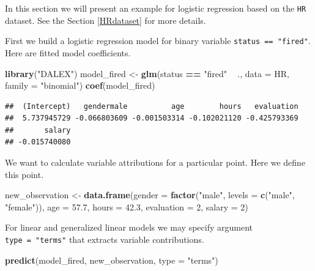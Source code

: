\documentclass[]{krantz}
\newenvironment{Shaded}{\begin{snugshade}}{\end{snugshade}}
\newcommand{\DataTypeTok}[1]{\textcolor[rgb]{0.13,0.29,0.53}{#1}}
\newcommand{\DecValTok}[1]{\textcolor[rgb]{0.00,0.00,0.81}{#1}}
\newcommand{\FloatTok}[1]{\textcolor[rgb]{0.00,0.00,0.81}{#1}}
\newcommand{\KeywordTok}[1]{\textcolor[rgb]{0.13,0.29,0.53}{\textbf{#1}}}
\newcommand{\NormalTok}[1]{#1}
\newcommand{\OperatorTok}[1]{\textcolor[rgb]{0.81,0.36,0.00}{\textbf{#1}}}
\newcommand{\StringTok}[1]{\textcolor[rgb]{0.31,0.60,0.02}{#1}}
\theoremstyle{definition}
\theoremstyle{definition}
\theoremstyle{definition}
\theoremstyle{remark}
\begin{document}
In this section we will present an example for logistic regression based
on the \texttt{HR} dataset. See the Section \ref{HRdataset} for more
details.

First we build a logistic regression model for binary variable
\texttt{status\ ==\ "fired"}. Here are fitted model coefficients.

\begin{Shaded}
\begin{Highlighting}[]
\KeywordTok{library}\NormalTok{(}\StringTok{"DALEX"}\NormalTok{)}
\NormalTok{model_fired <-}\StringTok{ }\KeywordTok{glm}\NormalTok{(status }\OperatorTok{==}\StringTok{ "fired"} \OperatorTok{~}\StringTok{ }\NormalTok{., }\DataTypeTok{data =}\NormalTok{ HR, }\DataTypeTok{family =} \StringTok{"binomial"}\NormalTok{)}
\KeywordTok{coef}\NormalTok{(model_fired)}
\end{Highlighting}
\end{Shaded}

\begin{verbatim}
##  (Intercept)   gendermale          age        hours   evaluation 
##  5.737945729 -0.066803609 -0.001503314 -0.102021120 -0.425793369 
##       salary 
## -0.015740080
\end{verbatim}

We want to calculate variable attributions for a particular point. Here
we define this point.

\begin{Shaded}
\begin{Highlighting}[]
\NormalTok{new_observation <-}\StringTok{ }\KeywordTok{data.frame}\NormalTok{(}\DataTypeTok{gender =} \KeywordTok{factor}\NormalTok{(}\StringTok{"male"}\NormalTok{, }\DataTypeTok{levels =} \KeywordTok{c}\NormalTok{(}\StringTok{"male"}\NormalTok{, }\StringTok{"female"}\NormalTok{)),}
                      \DataTypeTok{age =} \FloatTok{57.7}\NormalTok{,}
                      \DataTypeTok{hours =} \FloatTok{42.3}\NormalTok{,}
                      \DataTypeTok{evaluation =} \DecValTok{2}\NormalTok{,}
                      \DataTypeTok{salary =} \DecValTok{2}\NormalTok{)}
\end{Highlighting}
\end{Shaded}

For linear and generalized linear models we may specify argument
\texttt{type\ =\ "terms"} that extracts variable contributions.

\begin{Shaded}
\begin{Highlighting}[]
\KeywordTok{predict}\NormalTok{(model_fired, new_observation, }\DataTypeTok{type =} \StringTok{"terms"}\NormalTok{)}
\end{Highlighting}
\end{Shaded}
\end{document}
